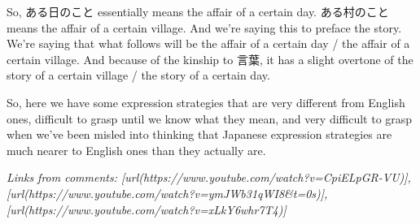So, ある日のこと essentially means the affair of a certain day. ある村のこと means the affair of a certain village. And we're saying this to preface the story. We're saying that what follows will be the affair of a certain day / the affair of a certain village. And because of the kinship to 言葉, it has a slight overtone of the story of a certain village / the story of a certain day.

So, here we have some expression strategies that are very different from English ones, difficult to grasp until we know what they mean, and very difficult to grasp when we've been misled into thinking that Japanese expression strategies are much nearer to English ones than they actually are.

{\em Links from comments: [url(https://www.youtube.com/watch?v=CpiELpGR-VU)], [url(https://www.youtube.com/watch?v=ymJWb31qWI8&t=0s)], [url(https://www.youtube.com/watch?v=xLkY6whr7T4)]}

\stopsectionlevel

\stopsectionlevel
